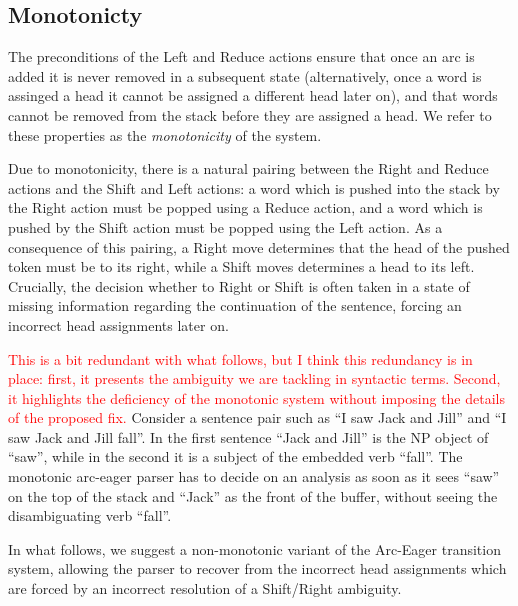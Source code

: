 \documentclass[11pt,letterpaper]{article}
\newcommand{\note}[1]{\textcolor{red}{#1}}
\begin{document}
\subsection{Monotonicty}

The preconditions of the Left and Reduce actions ensure that once an
arc is added it is never removed in a subsequent state (alternatively,
once a word is assinged a head it cannot be assigned a different head
later on), and that words cannot be removed from the stack before they
are assigned a head. We refer to these properties as the
\textit{monotonicity} of the system.

Due to monotonicity, there is a natural pairing between the Right and
Reduce actions and the Shift and Left actions: a word which is pushed
into the stack by the Right action must be popped using a Reduce
action, and a word which is pushed by the Shift action must be popped
using the Left action.
As a consequence of this pairing, a Right move determines that the head of
the pushed token must be to its right, while a Shift moves determines a head
to its left. Crucially, the decision whether to Right or Shift is often taken
in a state of missing information regarding the continuation of the sentence,
forcing an incorrect head assignments later on. 

\note{This is a bit redundant with what follows, but I think this redundancy
is in place: first, it presents the ambiguity we are tackling in syntactic
terms.  Second, it highlights the deficiency of the monotonic system without
imposing the details of the proposed fix.}
Consider a sentence pair such as ``I saw Jack and Jill'' and ``I saw Jack and Jill
fall''. In the first sentence ``Jack and Jill'' is the NP object of ``saw'', while
in the second it is a subject of the embedded verb ``fall''.  The monotonic arc-eager
parser has to decide on an analysis as soon as it sees ``saw'' on the top of the
stack and ``Jack'' as the front of the buffer, without seeing the
disambiguating verb ``fall''.  

In what follows, we suggest a non-monotonic variant of the Arc-Eager transition
system, allowing the parser to recover from the incorrect head assignments
which are forced by an incorrect resolution of a Shift/Right ambiguity.
\end{document}
